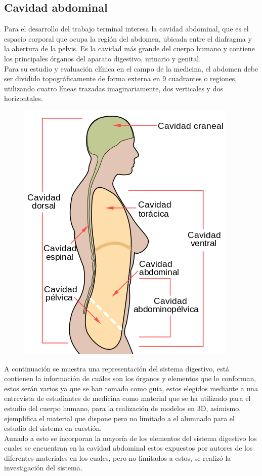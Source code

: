 \subsection{Cavidad abdominal}
Para el desarrollo del trabajo terminal interesa la cavidad abdominal, que es el espacio corporal que ocupa la región del abdomen, ubicada entre el diafragma y la abertura de la pelvis. Es la cavidad más grande del cuerpo humano y contiene los principales órganos del aparato digestivo, urinario y genital.\\
Para su estudio y evaluación clínica en el campo de la medicina, el abdomen debe ser dividido topográficamente de forma externa en 9 cuadrantes o regiones, utilizando cuatro líneas trazadas imaginariamente, dos verticales y dos horizontales.\cite{web12}\\
\begin{figure}[H]
	\begin{center}
 		\includegraphics[width = .3\textwidth]{source/images/image56.png}
	\end{center} 
\end{figure}
A continuación se muestra una representación del sistema digestivo, está contienen la información de cuáles son los órganos y elementos que lo conforman, estos serán varios ya que se han tomado como guía, estos elegidos mediante a una entrevista de estudiantes de medicina como material que se ha utilizado para el estudio del cuerpo humano, para la realización de modelos en 3D, asimismo, ejemplifica el material que dispone pero no limitado a el alumnado para el estudio del sistema en cuestión.\\
Aunado a esto se incorporan la mayoría de los elementos del sistema digestivo los cuales se encuentran en la cavidad abdominal estos expuestos por autores de los diferentes materiales en los cuales, pero no limitados a estos, se realizó la investigación del sistema.\\
